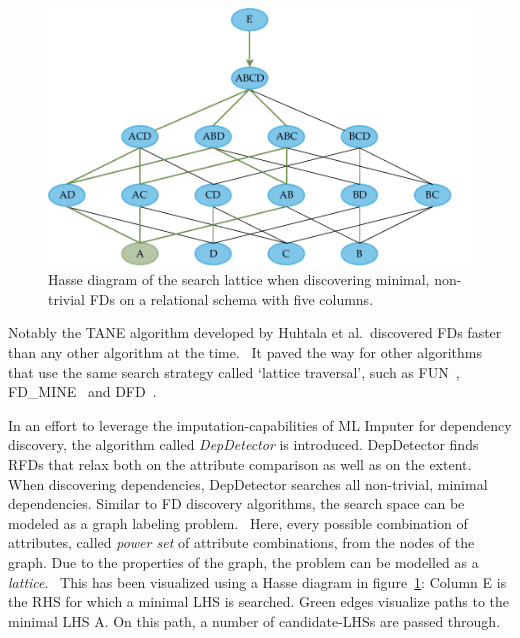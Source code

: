 \begin{figure}[ht]
     \centering
     \includegraphics[width=\textwidth]{images/search-lattice-fd.pdf}
     \caption{Hasse diagram of the search lattice when discovering minimal, non-trivial FDs on a relational schema with five columns.}
     \label{fig:dep-detector-search-tree}
 \end{figure}

 Notably the \textsc{TANE} algorithm developed by Huhtala et al.\ discovered FDs faster than any other algorithm at the time.~\cite[p.~108]{HUH99}
It paved the way for other algorithms that use the same search strategy called `lattice traversal', such as \textsc{FUN}~\cite{NOV08}, \textsc{FD\_MINE}~\cite{YAO02} and \textsc{DFD}~\cite{ABE14}.~\cite[p.~39]{ABE19}

In an effort to leverage the imputation-capabilities of ML Imputer for dependency discovery, the algorithm called \emph{DepDetector} is introduced.
DepDetector finds RFDs that relax both on the attribute comparison as well as on the extent.
When discovering dependencies, DepDetector searches all non-trivial, minimal dependencies.
Similar to FD discovery algorithms, the search space can be modeled as a graph labeling problem.~\cite[p.~24]{ABE19}
Here, every possible combination of attributes, called \emph{power set} of attribute combinations, from the nodes of the graph.
Due to the properties of the graph, the problem can be modelled as a \emph{lattice}.~\cite[p.~24]{ABE19}
This has been visualized using a Hasse diagram in figure~\ref{fig:dep-detector-search-tree}:
Column \textsc{E} is the RHS for which a minimal LHS is searched.
Green edges visualize paths to the minimal LHS \textsc{A}.
On this path, a number of candidate-LHSs are passed through.

